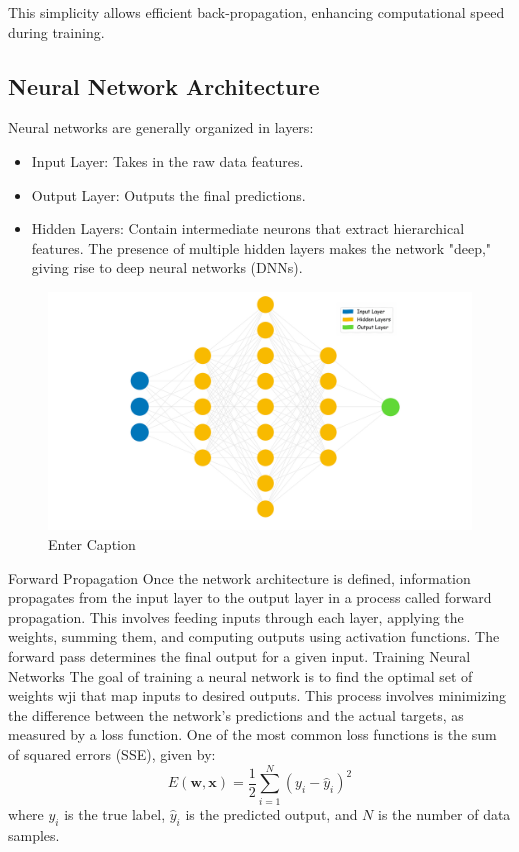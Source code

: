This simplicity allows efficient back-propagation, enhancing computational speed during training.

\subsection{Neural Network Architecture}
Neural networks are generally organized in layers:
\begin{itemize}
    \item Input Layer: Takes in the raw data features.
    \item Output Layer: Outputs the final predictions.
    \item Hidden Layers: Contain intermediate neurons that extract hierarchical features. The presence of multiple hidden layers makes the network "deep," giving rise to deep neural networks (DNNs).
\end{itemize}

\begin{figure}
    \centering
    \includegraphics[width=0.9\linewidth]{LateX//figs/nn_intro_def.pdf}
    \caption{Enter Caption}
    \label{fig:enter-label}
\end{figure}

Forward Propagation
Once the network architecture is defined, information propagates from the input layer to the output layer in a process called forward propagation. This involves feeding inputs through each layer, applying the weights, summing them, and computing outputs using activation functions. The forward pass determines the final output for a given input.
Training Neural Networks
The goal of training a neural network is to find the optimal set of weights wji that map inputs to desired outputs. This process involves minimizing the difference between the network’s predictions and the actual targets, as measured by a loss function.
One of the most common loss functions is the sum of squared errors (SSE), given by:
\begin{equation}
    E(\mathbf{w}, \mathbf{x}) = \frac{1}{2} \sum_{i=1}^{N} (y_i - \hat{y}_i)^2
\end{equation}
where $y_i$ is the true label, $\hat{y}_i$ is the predicted output, and $N$ is the number of data samples.

